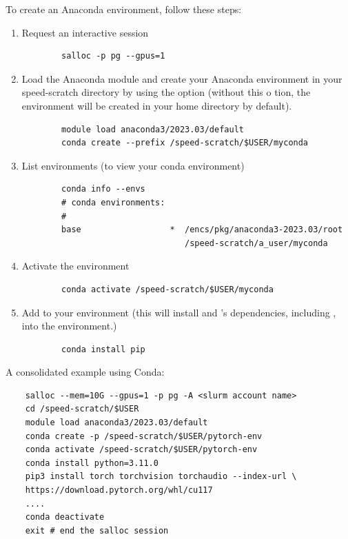 To create an Anaconda environment, follow these steps:
\begin{enumerate}
	\item Request an interactive session
	\begin{verbatim}
		salloc -p pg --gpus=1
	\end{verbatim}

	\item Load the Anaconda module and create your Anaconda environment in your speed-scratch directory by using
	the  option (without this o tion, the environment will be created in your home directory by default).
	\begin{verbatim}
		module load anaconda3/2023.03/default
		conda create --prefix /speed-scratch/$USER/myconda
	\end{verbatim}

	\item List environments (to view your conda environment)
	\begin{verbatim}
		conda info --envs
		# conda environments:
		#
		base                  *  /encs/pkg/anaconda3-2023.03/root
                         		 /speed-scratch/a_user/myconda
	\end{verbatim}

	\item Activate the environment
	\begin{verbatim}
		conda activate /speed-scratch/$USER/myconda
	\end{verbatim}

	\item Add  to your environment (this will install  and 's dependencies,
	including , into the environment.)
	\begin{verbatim}
		conda install pip
	\end{verbatim}
\end{enumerate}

\noindent A consolidated example using Conda:
\begin{verbatim}
    salloc --mem=10G --gpus=1 -p pg -A <slurm account name>
    cd /speed-scratch/$USER
    module load anaconda3/2023.03/default
    conda create -p /speed-scratch/$USER/pytorch-env
    conda activate /speed-scratch/$USER/pytorch-env
    conda install python=3.11.0
    pip3 install torch torchvision torchaudio --index-url \
    https://download.pytorch.org/whl/cu117
    ....
    conda deactivate
    exit # end the salloc session
\end{verbatim}

